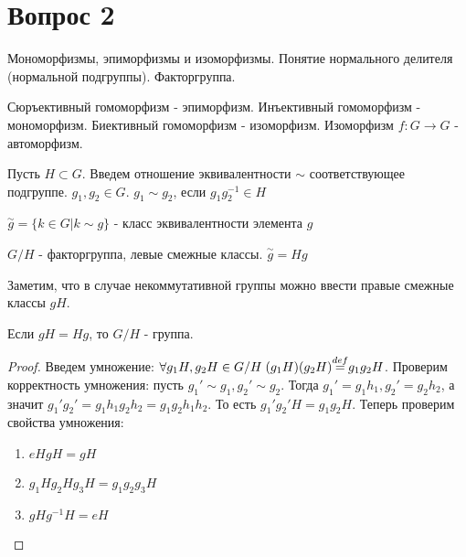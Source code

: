\section{Вопрос 2}

Мономорфизмы, эпиморфизмы и изоморфизмы. Понятие нормального делителя (нормальной подгруппы). Факторгруппа.

\begin{defn}
  Сюръективный гомоморфизм - эпиморфизм. \newline
  Инъективный гомоморфизм - мономорфизм. \newline
  Биективный гомоморфизм - изоморфизм. \newline
  Изоморфизм $ f: G \rightarrow G $ - автоморфизм. \newline
\end{defn}

Пусть $ H \subset G $. Введем отношение эквивалентности $ \sim $ соответствующее подгруппе. $ g_1, g_2 \in G $. $ g_1 \sim g_2 $, если $ g_{1}g_{2}^{-1} \in H $

\begin{defn}
  $  \overset{\sim}{g} = \{ k \in G | k \sim g\} $ - класс эквивалентности элемента $g$ 
\end{defn}

\begin{defn}
  $ G/H $ - факторгруппа, левые смежные классы. $ \overset{\sim}{g} = Hg $
\end{defn}

Заметим, что в случае некоммутативной группы можно ввести правые смежные классы $ gH $.

\begin{thm}
  Если $ gH = Hg $, то $ G/H $ - группа.
\end{thm}

\begin{proof}  
  Введем умножение: $ \forall g_{1}H, g_{2}H \in G/H \; (g_{1}H)(g_{2}H){\buildrel{def}\over{=}}g_{1}g_{2}H $.
  Проверим корректность умножения: пусть $ g_1' \sim g_1, g_2' \sim g_2 $. Тогда
  $ g_1' = g_{1}h_1, g_2' = g_{2}h_2 $, а значит $ g_{1}'g_{2}'= g_{1}h_{1}g_{2}h_{2} = g_{1}g_{2}h_{1}h_{2} $. 
  То есть $ g_{1}'g_{2}'H = g_{1}g_{2}H $. \newline
  Теперь проверим свойства умножения: 
  \begin{enumerate}
    \item $ eHgH = gH $
    \item $ g_{1}Hg_{2}Hg_{3}H = g_{1}g_{2}g_{3}H $
    \item $ gHg^{-1}H = eH $
  \end{enumerate}
\end{proof}

